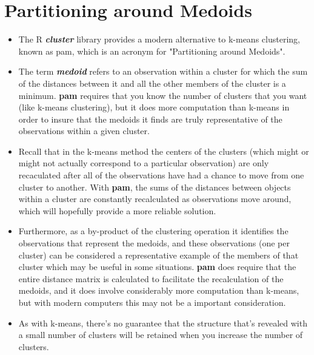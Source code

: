 \documentclass[RCluster.tex]{subfiles}
\begin{document}
\section{Partitioning around Medoids}
\begin{itemize}
\item The R \textbf{\textit{cluster}} library provides a modern alternative to k-means clustering, known as pam, which is an acronym for "Partitioning around Medoids". 

\item The term\textbf{ \textit{medoid}} refers to an observation within a cluster for which the sum of the distances between it and all the other members of the cluster is a minimum. \textbf{pam} requires that you know the number of clusters that you want (like k-means clustering), but it does more computation than k-means in order to insure that the medoids it finds are truly representative of the observations within a given cluster. 

\item  Recall that in the k-means method the centers of the clusters (which might or might not actually correspond to a particular observation) are only recaculated after all of the observations have had a chance to move from one cluster to another. With \textbf{pam}, the sums of the distances between objects within a cluster are constantly recalculated as observations move around, which will hopefully provide a more reliable solution. 
\item Furthermore, as a by-product of the clustering operation it identifies the observations that represent the medoids, and these observations (one per cluster) can be considered a representative example of the members of that cluster which may be useful in some situations. \textbf{pam} does require that the entire distance matrix is calculated to facilitate the recalculation of the medoids, and it does involve considerably more computation than k-means, but with modern computers this may not be a important consideration. 
\item As with k-means, there's no guarantee that the structure that's revealed with a small number of clusters will be retained when you increase the number of clusters.
\end{itemize}
\end{document}
